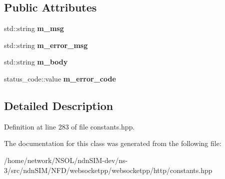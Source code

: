 \subsection*{Public Attributes}
\begin{DoxyCompactItemize}
\item 
std\+::string {\bfseries m\+\_\+msg}\hypertarget{classwebsocketpp_1_1http_1_1exception_a2be9d8a05bad1b10432fdf4e25159dfe}{}\label{classwebsocketpp_1_1http_1_1exception_a2be9d8a05bad1b10432fdf4e25159dfe}

\item 
std\+::string {\bfseries m\+\_\+error\+\_\+msg}\hypertarget{classwebsocketpp_1_1http_1_1exception_ab723cf4d6e80075e9a73da3b7577cdc3}{}\label{classwebsocketpp_1_1http_1_1exception_ab723cf4d6e80075e9a73da3b7577cdc3}

\item 
std\+::string {\bfseries m\+\_\+body}\hypertarget{classwebsocketpp_1_1http_1_1exception_ac8a456ed1db5ead45831fdc61b216958}{}\label{classwebsocketpp_1_1http_1_1exception_ac8a456ed1db5ead45831fdc61b216958}

\item 
status\+\_\+code\+::value {\bfseries m\+\_\+error\+\_\+code}\hypertarget{classwebsocketpp_1_1http_1_1exception_a169eaa70f405f073091194113fe75d0c}{}\label{classwebsocketpp_1_1http_1_1exception_a169eaa70f405f073091194113fe75d0c}

\end{DoxyCompactItemize}


\subsection{Detailed Description}


Definition at line 283 of file constants.\+hpp.



The documentation for this class was generated from the following file\+:\begin{DoxyCompactItemize}
\item 
/home/network/\+N\+S\+O\+L/ndn\+S\+I\+M-\/dev/ns-\/3/src/ndn\+S\+I\+M/\+N\+F\+D/websocketpp/websocketpp/http/constants.\+hpp\end{DoxyCompactItemize}
